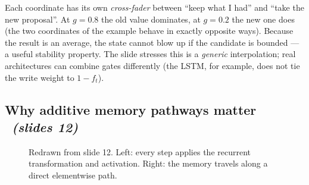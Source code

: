 \documentclass[11pt,a4paper]{article}
\newcommand{\sltag}[1]{\texorpdfstring{\ \emph{(slides #1)}}{ (slides #1)}}
\begin{document}
\begin{intuition}
Each coordinate has its own \emph{cross-fader} between ``keep what I had'' and ``take the new proposal''. At $g=0.8$ the old value dominates, at $g=0.2$ the new one does (the two coordinates of the example behave in exactly opposite ways). Because the result is an average, the state cannot blow up if the candidate is bounded --- a useful stability property. The slide stresses this is a \emph{generic} interpolation; real architectures can combine gates differently (the LSTM, for example, does not tie the write weight to $1-f_t$).
\end{intuition}

\subsection{Why additive memory pathways matter \sltag{12}}

\begin{figure}[H]\centering
{}
\caption{Redrawn from slide 12. Left: every step applies the recurrent transformation and activation. Right: the memory travels along a direct elementwise path.}
\end{figure}
\end{document}
